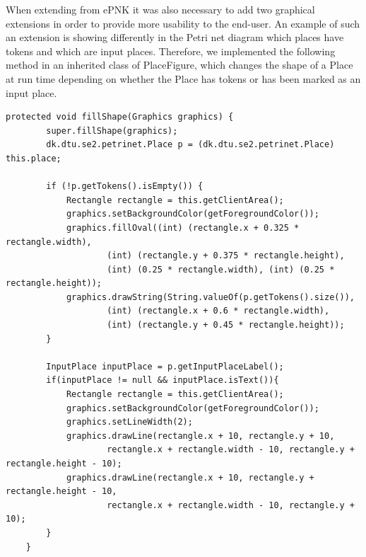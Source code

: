 When extending from ePNK it was also necessary to add two graphical extensions in order to provide more usability to the end-user. An example of such an extension is showing differently in the Petri net diagram which places have tokens and which are input places. Therefore, we implemented the following method in an inherited class of PlaceFigure, which changes the shape of a Place at run time depending on whether the Place has tokens or has been marked as an input place.
\begin{lstlisting}
protected void fillShape(Graphics graphics) {
		super.fillShape(graphics);
		dk.dtu.se2.petrinet.Place p = (dk.dtu.se2.petrinet.Place) this.place;
		
		if (!p.getTokens().isEmpty()) {
			Rectangle rectangle = this.getClientArea();
			graphics.setBackgroundColor(getForegroundColor());
			graphics.fillOval((int) (rectangle.x + 0.325 * rectangle.width), 
					(int) (rectangle.y + 0.375 * rectangle.height),
					(int) (0.25 * rectangle.width), (int) (0.25 * rectangle.height));
			graphics.drawString(String.valueOf(p.getTokens().size()), 
					(int) (rectangle.x + 0.6 * rectangle.width), 
					(int) (rectangle.y + 0.45 * rectangle.height));
		}
		
		InputPlace inputPlace = p.getInputPlaceLabel();
		if(inputPlace != null && inputPlace.isText()){
			Rectangle rectangle = this.getClientArea();
			graphics.setBackgroundColor(getForegroundColor());
			graphics.setLineWidth(2);
			graphics.drawLine(rectangle.x + 10, rectangle.y + 10, 
					rectangle.x + rectangle.width - 10, rectangle.y + rectangle.height - 10);
			graphics.drawLine(rectangle.x + 10, rectangle.y + rectangle.height - 10, 
					rectangle.x + rectangle.width - 10, rectangle.y + 10);
		}
	}
\end{lstlisting}